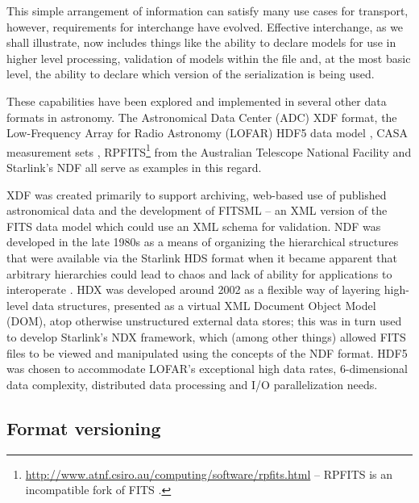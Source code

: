\documentclass[final,authoryear,5p,times,twocolumn]{elsarticle}
\begin{document}
{{This simple arrangement of information can satisfy many use cases for
transport, however, requirements for interchange have evolved. Effective
interchange, as we shall illustrate, now includes things like the ability to
declare models for use in higher level processing, validation of models within
the file and, at the most basic level, the ability to declare which version of
the serialization is being used.


These capabilities have been explored and implemented in several other data formats in astronomy.
The Astronomical Data Center (ADC) XDF
format, the Low-Frequency Array for Radio Astronomy (LOFAR) HDF5 data
model \citep{2012ASPC..461..283A}, CASA measurement sets
\citep{2012ASPC..461..849P},
RPFITS\footnote{\url{http://www.atnf.csiro.au/computing/software/rpfits.html}
-- RPFITS is an incompatible fork of FITS \citep[see e.g.,][]{1998ASPC..145...32B}.} from the Australian Telescope
National Facility
and Starlink's NDF
\citep{1988STARB...2...11C,1993ASPC...52..229W,P91_adassxxiii} all
serve as examples in this regard.

XDF \citep{2001ASPC..238..217S} was created primarily to support archiving, web-based use of
published astronomical data and the development of FITSML -- an XML version
of the FITS data model which could use an XML schema for validation.
NDF was developed in the late
1980s as a means of organizing the hierarchical structures that were
available via the Starlink HDS format when it became apparent that
arbitrary hierarchies could lead to chaos and lack of ability for
applications to interoperate \citep{2015Jenness}.
HDX \citep{2003ASPC..295..221G} was developed around 2002 as a flexible
way of layering high-level data structures, presented as a virtual XML
Document Object Model (DOM), atop otherwise unstructured external data stores; this was in
turn used to develop Starlink's NDX framework, which (among other
things) allowed FITS files to be viewed and manipulated using the
concepts of the NDF format.
HDF5 \citep{2012ASPC..461..283A} was chosen to accommodate LOFAR's
exceptional high data rates, 6-dimensional data complexity, distributed
data processing and I/O parallelization needs.



\subsection{Format versioning}
\label{subsection_format_versioning}

}}
\end{document}
